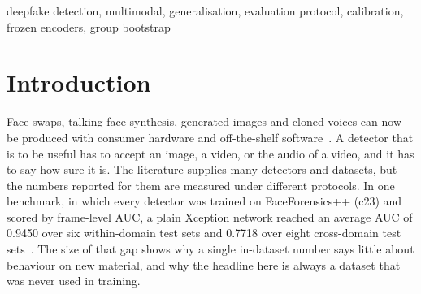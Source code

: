 \documentclass[conference,a4paper]{IEEEtran_nodash}
\begin{document}
\begin{abstract}
version, a paired difference of +0.1980 [+0.1688, +0.2242], improved by the
declared rule and also at the 98.33\,\% level. On the sealed In-the-Wild test
(24\,788 clips, 42 speakers) the final speech system reaches 0.9148 [0.8896,
0.9383] against 0.7516 [0.6802, 0.8035], a difference of +0.1633 [+0.1177,
+0.2266], improved and robust. Against the re-run Xception baseline (AUC 0.8042
[0.7841, 0.8223]) the final video system is higher by +0.0176 [+0.0025, +0.0327],
superior by the declared 95\,\% rule; the 98.33\,\% interval
[$-0.0011$, +0.0355] contains zero, so superiority is not robust to the
Bonferroni level, while non-inferiority with a margin of 0.0100 holds at both
levels. Two of the five written predictions, both for speech, failed in the
optimistic direction. The limits of the evidence include one baseline family at
one input size, 344 groups for video, 42 speakers for speech, a margin set from
three seeds and a floor, and one sealed run of each frozen iteration.
After the freeze the detectors were wrapped in a modular analysis platform that
reports one finding per module and no overall score. On the sealed half of
FakeAVCeleb the frozen system ranks well (visual AUC 0.9552, audio 0.9263) but
its thresholds do not transfer and the data set carries a codec shortcut; a
generated-video head is at chance on DF26 (0.4957), so it stays experimental. %
\end{abstract}

\begin{IEEEkeywords}
deepfake detection, multimodal, generalisation, evaluation protocol,
calibration, frozen encoders, group bootstrap
\end{IEEEkeywords}

\section{Introduction}\label{sec:intro}

Face swaps, talking-face synthesis, generated images and cloned voices can now
be produced with consumer hardware and off-the-shelf
software~\cite{dolhansky2020dfdc}. A detector that is to be useful has to
accept an image, a video, or the audio of a video, and it has to say how sure
it is. The literature supplies many detectors and datasets, but the numbers
reported for them are measured under different protocols. In one benchmark, in
which every detector was trained on FaceForensics++ (c23) and scored by
frame-level AUC, a plain Xception network reached an average AUC of 0.9450 over six within-domain test sets and 0.7718 over eight cross-domain test sets~\cite{yan2023deepfakebench}. %
The size of that gap shows why a single in-dataset number says little about
behaviour on new material, and why the headline here is always a dataset that
was never used in training.
\end{document}
